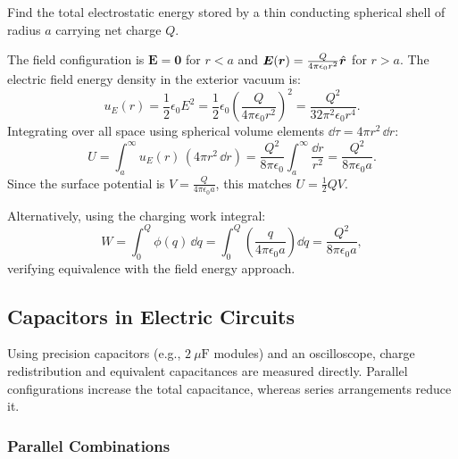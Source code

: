 \begin{example}
    Find the total electrostatic energy stored by a thin conducting spherical shell of radius \(a\) carrying net charge \(Q\).
    
    The field configuration is \(\bm{E} = \bm{0}\) for \(r < a\) and \(\bm{E}(\bm{r}) = \frac{Q}{4\pi\epsilon_0 r^2}\hat{\bm{r}}\) for $r > a$. The electric field energy density in the exterior vacuum is:
    \begin{equation}
        u_E(r) = \frac{1}{2}\epsilon_0 E^2 = \frac{1}{2}\epsilon_0 \left(\frac{Q}{4\pi\epsilon_0 r^2}\right)^2 = \frac{Q^2}{32\pi^2\epsilon_0 r^4}.
    \end{equation}
    Integrating over all space using spherical volume elements \(\dd\tau = 4\pi r^2\,\dd r\):
    \begin{equation}
        U = \int_a^\infty u_E(r)\,(4\pi r^2\,\dd r) = \frac{Q^2}{8\pi\epsilon_0} \int_a^\infty \frac{\dd r}{r^2} = \frac{Q^2}{8\pi\epsilon_0 a}.
    \end{equation}
    Since the surface potential is \(V = \frac{Q}{4\pi\epsilon_0 a}\), this matches \(U = \frac{1}{2}QV\).
    
    Alternatively, using the charging work integral:
    \begin{equation}
        W = \int_0^Q \phi(q)\,\dd q = \int_0^Q \left(\frac{q}{4\pi\epsilon_0 a}\right)\dd q = \frac{Q^2}{8\pi\epsilon_0 a},
    \end{equation}
    verifying equivalence with the field energy approach.
\end{example}

\subsection{Capacitors in Electric Circuits}

\begin{remark}
    Using precision capacitors (e.g., \(2\ \mu\mathrm{F}\) modules) and an oscilloscope, charge redistribution and equivalent capacitances are measured directly. Parallel configurations increase the total capacitance, whereas series arrangements reduce it.
\end{remark}

\subsubsection{Parallel Combinations}

